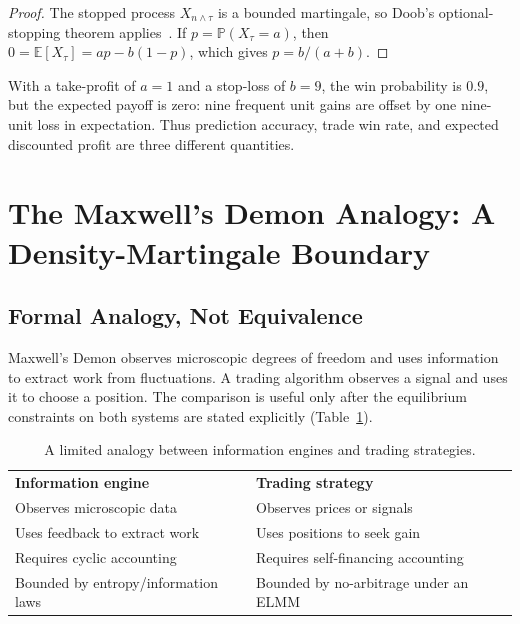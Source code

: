 \documentclass[aps,pra,reprint,superscriptaddress,amsmath,amssymb,floatfix]{revtex4-2}
\theoremstyle{plain}
\theoremstyle{definition}
\theoremstyle{remark}
\begin{document}
\begin{proof}
The stopped process \(X_{n\wedge\tau}\) is a bounded martingale, so Doob's
optional-stopping theorem applies~\cite{Doob1953}. If
\(p=\mathbb{P}(X_\tau=a)\), then
\(0=\mathbb{E}[X_\tau]=ap-b(1-p)\), which gives
\(p=b/(a+b)\).
\end{proof}

With a take-profit of \(a=1\) and a stop-loss of \(b=9\), the win probability
is \(0.9\), but the expected payoff is zero: nine frequent unit gains are
offset by one nine-unit loss in expectation. Thus prediction accuracy, trade
win rate, and expected discounted profit are three different quantities.

\section{The Maxwell's Demon Analogy: A Density-Martingale Boundary}
\label{sec:demon}

\subsection{Formal Analogy, Not Equivalence}

Maxwell's Demon observes microscopic degrees of freedom and uses information
to extract work from fluctuations. A trading algorithm observes a signal and
uses it to choose a position. The comparison is useful only after the
equilibrium constraints on both systems are stated explicitly
(Table~\ref{tab:demon}).

\begin{table}[htbp]
\caption{\label{tab:demon}A limited analogy between information engines and trading strategies.}
\centering
\begin{ruledtabular}
\begin{tabular}{p{}p{}}
\textbf{Information engine} & \textbf{Trading strategy} \\
\colrule
Observes microscopic data & Observes prices or signals \\
Uses feedback to extract work & Uses positions to seek gain \\
Requires cyclic accounting & Requires self-financing accounting \\
Bounded by entropy/information laws & Bounded by no-arbitrage under an ELMM \\
\end{tabular}
\end{ruledtabular}
\end{table}
\end{document}
